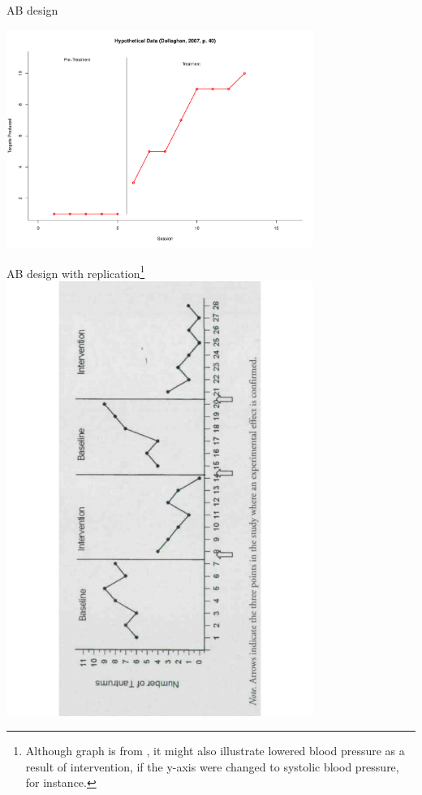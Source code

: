 \documentclass{beamer}
\begin{document}
% 
\begin{frame}{AB design}	
	\begin{center}
	\includegraphics[width=10cm]{SSD/ABplot.pdf}
	\end{center}
\end{frame}

% 
\begin{frame}{AB design with replication\footnote{\tiny{Although graph is from \citet[p. 169]{Horner2005}, it might also illustrate lowered blood pressure as a result of intervention, if the y-axis were changed to systolic blood pressure, for instance.}}}
	\includegraphics[angle=270, width=10cm]{images/horner2005_p169.pdf}
\end{frame}
\end{document}
